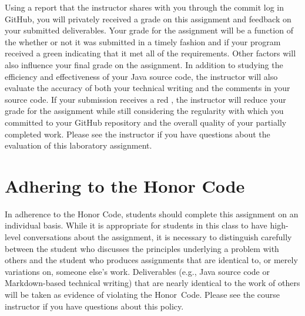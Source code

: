 \documentclass[11pt]{article}
\newcommand{\checkmark}{\ding{51}}
\newcommand{\naughtmark}{\ding{55}}
\begin{document}
Using a report that the instructor shares with you through the commit log in GitHub, you will privately received a grade
on this assignment and feedback on your submitted deliverables. Your grade for the assignment will be a function of the
whether or not it was submitted in a timely fashion and if your program received a green \checkmark{} indicating that it
met all of the requirements. Other factors will also influence your final grade on the assignment. In addition to
studying the efficiency and effectiveness of your Java source code, the instructor will also evaluate the accuracy of
both your technical writing and the comments in your source code. If your submission receives a red \naughtmark{}, the
instructor will reduce your grade for the assignment while still considering the regularity with which you committed to
your GitHub repository and the overall quality of your partially completed work. Please see the instructor if you have
questions about the evaluation of this laboratory assignment.

\section*{Adhering to the Honor Code}

In adherence to the Honor Code, students should complete this assignment on an individual basis. While it is appropriate
for students in this class to have high-level conversations about the assignment, it is necessary to distinguish
carefully between the student who discusses the principles underlying a problem with others and the student who produces
assignments that are identical to, or merely variations on, someone else's work. Deliverables (e.g., Java source code or
Markdown-based technical writing) that are nearly identical to the work of others will be taken as evidence of violating
the \mbox{Honor Code}. Please see the course instructor if you have questions about this policy.
\end{document}
